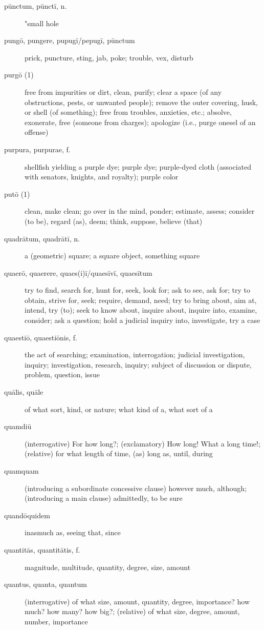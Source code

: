 \begin{description}
    \item[pūnctum, pūnctī, n.]  "small hole
    \item[pungō, pungere, pupugī/pepugī, pūnctum] prick, puncture, sting, jab, poke; trouble, vex, disturb
    \item[purgō (1)] free from impurities or dirt, clean, purify; clear a space (of any obstructions, pests, or unwanted people); remove the outer covering, husk, or shell (of something); free from troubles, anxieties, etc.; absolve, exonerate, free (someone from charges); apologize (i.e., purge onesel of an offense)
    \item[purpura, purpurae, f.] shellfish yielding a purple dye; purple dye; purple-dyed cloth (associated with senators, knights, and royalty); purple color
    \item[putō (1)] \marginnote{*}clean, make clean; go over in the mind, ponder; estimate, assess; consider (to be), regard (as), deem; think, suppose, believe (that)
    \item[quadrātum, quadrātī, n.] a (geometric) square; a square object, something square
    \item[quaerō, quaerere, quaes(i)ī/quaesīvī, quaesītum] \marginnote{*}try to find, search for, hunt for, seek, look for; ask to see, ask for; try to obtain, strive for, seek; require, demand, need; try to bring about, aim at, intend, try (to); seek to know about, inquire about, inquire into, examine, consider; ask a question; hold a judicial inquiry into, investigate, try a case
    \item[quaestiō, quaestiōnis, f.] the act of searching; examination, interrogation; judicial investigation, inquiry; investigation, research, inquiry; subject of discussion or dispute, problem, question, issue
    \item[quālis, quāle] \marginnote{*}of what sort, kind, or nature; what kind of a, what sort of a
    \item[quamdiū] (interrogative) For how long?; (exclamatory) How long! What a long time!; (relative) for what length of time, (as) long as, until, during
    \item[quamquam] \marginnote{*}(introducing a subordinate concessive clause) however much, although; (introducing a main clause) admittedly, to be sure
    \item[quandōquidem] inasmuch as, seeing that, since
    \item[quantitās, quantitātis, f.] magnitude, multitude, quantity, degree, size, amount
    \item[quantus, quanta, quantum] \marginnote{*}(interrogative) of what size, amount, quantity, degree, importance? how much? how many? how big?; (relative) of what size, degree, amount, number, importance

\end{description}
